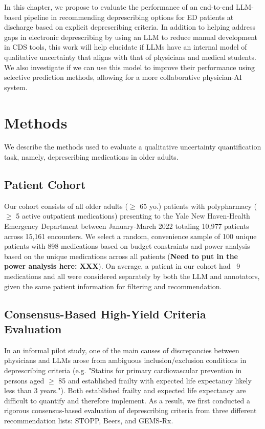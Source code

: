 In this chapter, we propose to evaluate the performance of an end-to-end LLM-based pipeline in recommending deprescribing options for ED patients at discharge based on explicit deprescribing criteria. In addition to helping address gaps in electronic deprescribing by using an LLM to reduce manual development in CDS tools, this work will  help elucidate if LLMs have an internal model of qualitative uncertainty that aligns with that of physicians and medical students. We also investigate if we can use this model to improve their performance using selective prediction methods, allowing for a more collaborative physician-AI system.



\section{Methods}

We describe the methods used to evaluate a qualitative uncertainty quantification task, namely, deprescribing  medications in older adults. 

\subsection{Patient Cohort}

Our cohort consists of all older adults ($\geq$ 65 yo.) patients with polypharmacy ($\geq$ 5 active outpatient medications) presenting to the Yale New Haven-Health Emergency Department between January-March 2022 totaling 10,977 patients across 15,161 encounters. We select a random, convenience sample of 100 unique patients with 898 medications based on budget constraints and power analysis based on the unique medications across all patients (\textbf{Need to put in the power analysis here: XXX}). On average, a patient in our cohort had ~9 medications and all were considered separately by both the LLM and annotators, given the same patient information for filtering and recommendation. 

\subsection{Consensus-Based High-Yield Criteria Evaluation}

In an informal pilot study, one of the main causes of discrepancies between physicians and LLMs arose from ambiguous inclusion/exclusion conditions in deprescribing criteria (e.g. "Statins for primary cardiovascular prevention in persons aged $\geq$ 85 and established frailty with expected life expectancy likely less than 3 years."). Both established frailty and expected life expectancy are difficult to quantify and therefore implement. As a result, we first conducted a rigorous consensus-based evaluation of deprescribing criteria from three different recommendation lists: STOPP, Beers, and GEMS-Rx. 

